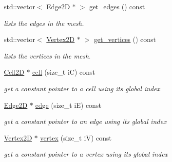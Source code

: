 \begin{DoxyCompactItemize}
std\+::vector$<$ \hyperlink{classHArDCore2D_1_1Edge2D}{Edge2D} $\ast$ $>$ \hyperlink{group__Mesh2D_ga5320100a180fdbe7de5547c05a6d48fd}{get\+\_\+edges} () const
\begin{DoxyCompactList}\small\item\em lists the edges in the mesh. \end{DoxyCompactList}\item 
std\+::vector$<$ \hyperlink{classHArDCore2D_1_1Vertex2D}{Vertex2D} $\ast$ $>$ \hyperlink{group__Mesh2D_ga9a25caa2da4d3047e9c6a5ebb52501ae}{get\+\_\+vertices} () const
\begin{DoxyCompactList}\small\item\em lists the vertices in the mesh. \end{DoxyCompactList}\item 
\mbox{\label{classHArDCore2D_1_1Mesh2D_a1d8c40ea85f0abe3ae5aea23e4a95583}} 
\hyperlink{classHArDCore2D_1_1Cell2D}{Cell2D} $\ast$ \hyperlink{classHArDCore2D_1_1Mesh2D_a1d8c40ea85f0abe3ae5aea23e4a95583}{cell} (size\+\_\+t iC) const
\begin{DoxyCompactList}\small\item\em get a constant pointer to a cell using its global index \end{DoxyCompactList}\item 
\mbox{\label{classHArDCore2D_1_1Mesh2D_a9dd54d7b118e6f645d9af819a7555e93}} 
\hyperlink{classHArDCore2D_1_1Edge2D}{Edge2D} $\ast$ \hyperlink{classHArDCore2D_1_1Mesh2D_a9dd54d7b118e6f645d9af819a7555e93}{edge} (size\+\_\+t iE) const
\begin{DoxyCompactList}\small\item\em get a constant pointer to an edge using its global index \end{DoxyCompactList}\item 
\mbox{\label{classHArDCore2D_1_1Mesh2D_ac29a7c5c0c36b3aa519520fbb9cf20de}} 
\hyperlink{classHArDCore2D_1_1Vertex2D}{Vertex2D} $\ast$ \hyperlink{classHArDCore2D_1_1Mesh2D_ac29a7c5c0c36b3aa519520fbb9cf20de}{vertex} (size\+\_\+t iV) const
\begin{DoxyCompactList}\small\item\em get a constant pointer to a vertex using its global index \end{DoxyCompactList}\item 

\end{DoxyCompactItemize}

